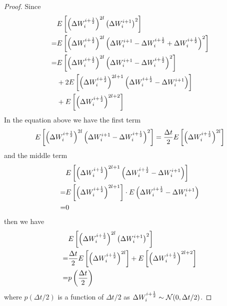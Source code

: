 \documentclass{homework}
\begin{document}
    \begin{proof}
        Since
        \[\begin{aligned}
            &E\left[
            \left(\Delta W_{i}^{i+\frac{1}{2}}\right)^{2l}
            \left(\Delta W_{i}^{i+1}\right)^2
            \right]\\
            =&E\left[
            \left(\Delta W_{i}^{i+\frac{1}{2}}\right)^{2l}
            \left(\Delta W_{i}^{i+1}-\Delta W_{i}^{i+\frac{1}{2}}+\Delta W_{i}^{i+\frac{1}{2}}\right)^2
            \right]\\
            =&\begin{aligned}[t]
            &E\left[
            \left(\Delta W_{i}^{i+\frac{1}{2}}\right)^{2l}\left(\Delta W_{i}^{i+1}-\Delta W_{i}^{i+\frac{1}{2}}\right)^2
            \right]\\
            &+2E\left[
            \left(\Delta W_{i}^{i+\frac{1}{2}}\right)^{2l+1}\left(\Delta W_{i}^{i+\frac{1}{2}}-\Delta W_{i}^{i+1}\right)
            \right]\\
            &+E\left[\left(\Delta W_{i}^{i+\frac{1}{2}}\right)^{2l+2}\right]\\
            \end{aligned}\\
        \end{aligned}\]
        In the equation above we have the first term
        \[\begin{aligned}
            E\left[
            \left(\Delta W_{i}^{i+\frac{1}{2}}\right)^{2l}\left(\Delta W_{i}^{i+1}-\Delta W_{i}^{i+\frac{1}{2}}\right)^2
            \right]
            =\frac{\Delta t}{2}E\left[\left(\Delta W_{i}^{i+\frac{1}{2}}\right)^{2l}\right]
        \end{aligned}\]
        and the middle term
        \[\begin{aligned}
            &E\left[\left(\Delta W_{i}^{i+\frac{1}{2}}\right)^{2l+1}\left(\Delta W_{i}^{i+\frac{1}{2}}-\Delta W_{i}^{i+1}\right)\right]\\
            =&
            E\left[\left(\Delta W_{i}^{i+\frac{1}{2}}\right)^{2l+1}\right]
            \cdot E\left(\Delta W_{i}^{i+\frac{1}{2}}-\Delta W_{i}^{i+1}\right)\\
            =&0\\
        \end{aligned}\]
        then we have
        \renewcommand{\theequation}{A.\arabic{equation}}
        \begin{equation}
            \label{eq:def of p}
            \begin{aligned}
            &E\left[
            \left(\Delta W_{i}^{i+\frac{1}{2}}\right)^{2l}
            \left(\Delta W_{i}^{i+1}\right)^2
            \right]\\
            =&\frac{\Delta t}{2}E\left[\left(\Delta W_{i}^{i+\frac{1}{2}}\right)^{2l}\right]
            +E\left[\left(\Delta W_{i}^{i+\frac{1}{2}}\right)^{2l+2}\right]\\
            =&p\left(\frac{\Delta t}{2}\right)
            \end{aligned}
        \end{equation}
        where $p(\Delta t/2)$ is a function of $\Delta t/2$
        as $\Delta W_{i}^{i+\frac{1}{2}}\sim\mathcal N(0,\Delta t/2)$.
    \end{proof}
\end{document}
